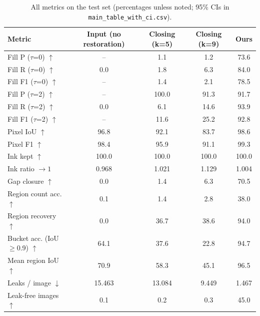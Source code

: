 \begin{table}[t]
\centering
\small
\begin{tabular}{lcccc}
\toprule
Metric & Input (no restoration) & Closing (k=5) & Closing (k=9) & Ours \\
\midrule
Fill P ($\tau$=0) $\uparrow$ & -- & 1.1 & 1.2 & 73.6 \\
Fill R ($\tau$=0) $\uparrow$ & 0.0 & 1.8 & 6.3 & 84.0 \\
Fill F1 ($\tau$=0) $\uparrow$ & -- & 1.4 & 2.1 & 78.5 \\
Fill P ($\tau$=2) $\uparrow$ & -- & 100.0 & 91.3 & 91.7 \\
Fill R ($\tau$=2) $\uparrow$ & 0.0 & 6.1 & 14.6 & 93.9 \\
Fill F1 ($\tau$=2) $\uparrow$ & -- & 11.6 & 25.2 & 92.8 \\
Pixel IoU $\uparrow$ & 96.8 & 92.1 & 83.7 & 98.6 \\
Pixel F1 $\uparrow$ & 98.4 & 95.9 & 91.1 & 99.3 \\
Ink kept $\uparrow$ & 100.0 & 100.0 & 100.0 & 100.0 \\
Ink ratio $\to 1$ & 0.968 & 1.021 & 1.129 & 1.004 \\
Gap closure $\uparrow$ & 0.0 & 1.4 & 6.3 & 70.5 \\
Region count acc. $\uparrow$ & 0.1 & 1.4 & 2.8 & 38.0 \\
Region recovery $\uparrow$ & 0.0 & 36.7 & 38.6 & 94.0 \\
Bucket acc. (IoU$\geq$0.9) $\uparrow$ & 64.1 & 37.6 & 22.8 & 94.7 \\
Mean region IoU $\uparrow$ & 70.9 & 58.3 & 45.1 & 96.5 \\
Leaks / image $\downarrow$ & 15.463 & 13.084 & 9.449 & 1.467 \\
Leak-free images $\uparrow$ & 0.1 & 0.2 & 0.3 & 45.0 \\
\bottomrule
\end{tabular}
\caption{All metrics on the test set (percentages unless noted; 95\% CIs in \texttt{main\_table\_with\_ci.csv}).}
\label{tab:all_results}
\end{table}